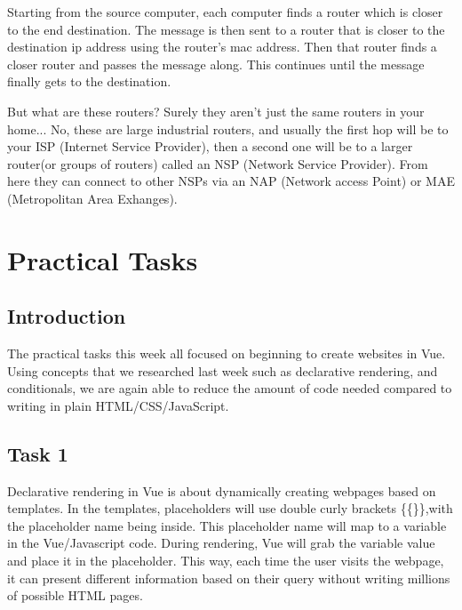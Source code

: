 \documentclass[portfolio.tex]{subfiles}
\begin{document}
					Starting from the source computer, each computer finds a router which is closer to the end destination. The message is then sent to a router that is closer to the destination ip address using the router's mac address. Then that router finds a closer router and passes the message along. This continues until the message finally gets to the destination.

					But what are these routers? Surely they aren't just the same routers in your home... No, these are large industrial routers, and usually the first hop will be to your ISP (Internet Service Provider), then a second one will be to a larger router(or groups of routers) called an NSP (Network Service Provider). From here they can connect to other NSPs via an NAP (Network access Point) or MAE (Metropolitan Area Exhanges).   \autocite[The Internet Routing Hierarchy]{stanford-internet}\\

					\hspace{-0.9cm}
		\section{Practical Tasks}

			\subsection{Introduction}
				The practical tasks this week all focused on beginning to create websites in Vue. Using concepts that we researched last week such as declarative rendering,  and conditionals, we are again able to reduce the amount of code needed compared to writing in plain HTML/CSS/JavaScript.

			\subsection{Task 1}
				Declarative rendering in Vue is about dynamically creating webpages based on templates. In the templates, placeholders will use double curly brackets \{\{\}\},with the placeholder name being inside. This placeholder name will map to a variable in the Vue/Javascript code. During rendering, Vue will grab the variable value and place it in the placeholder. This way, each time the user visits the webpage, it can present different information based on their query without writing millions of possible HTML pages.\\
\end{document}
